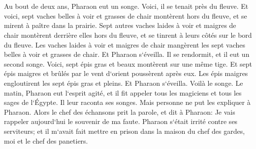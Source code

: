 \chapter{}

\verse Au bout de deux ans, Pharaon eut un songe. Voici, il se tenait près du fleuve. 
\verse Et voici, sept vaches belles à voir et grasses de chair montèrent hors du fleuve, et se mirent à paître dans la prairie. 
\verse Sept autres vaches laides à voir et maigres de chair montèrent derrière elles hors du fleuve, et se tinrent à leurs côtés sur le bord du fleuve. 
\verse Les vaches laides à voir et maigres de chair mangèrent les sept vaches belles à voir et grasses de chair. Et Pharaon s`éveilla. 
\verse Il se rendormit, et il eut un second songe. Voici, sept épis gras et beaux montèrent sur une même tige. 
\verse Et sept épis maigres et brûlés par le vent d`orient poussèrent après eux. 
\verse Les épis maigres engloutirent les sept épis gras et pleins. Et Pharaon s`éveilla. Voilà le songe. 
\verse Le matin, Pharaon eut l`esprit agité, et il fit appeler tous les magiciens et tous les sages de l`Égypte. Il leur raconta ses songes. Mais personne ne put les expliquer à Pharaon. 
\verse Alors le chef des échansons prit la parole, et dit à Pharaon: Je vais rappeler aujourd`hui le souvenir de ma faute. 
\verse Pharaon s`était irrité contre ses serviteurs; et il m`avait fait mettre en prison dans la maison du chef des gardes, moi et le chef des panetiers. 
